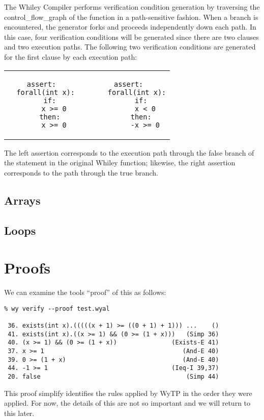 The Whiley Compiler performs verification condition generation by
traversing the \gls{control_flow_graph} of the function in a
path-sensitive fashion.  When a branch is encountered, the generator
forks and proceeds independently down each path.  In this case, four
verification conditions will be generated since there are two
 clauses and two execution paths.  The following
two verification conditions are generated for the first clause by each
execution path:

\begin{center}
\begin{tabular}{c c c}
\begin{minipage}[t]{0.45\textwidth}
\begin{lstlisting}[language=WyAL]
assert:
  forall(int x):
    if:
      x >= 0
    then:
      x >= 0
\end{lstlisting}
\end{minipage}&&
\begin{minipage}[t]{0.45\textwidth}
\begin{lstlisting}[language=WyAL]
  assert:
    forall(int x):
      if:
        x < 0
      then:
        -x >= 0
\end{lstlisting}
\end{minipage}\\
\end{tabular}
\end{center}
The left assertion corresponds to the execution path through the false
branch of the  statement in the original Whiley
function; likewise, the right assertion corresponds to the path
through the true branch.  

\subsection{Arrays}
\subsection{Loops}


\section{Proofs}

We can examine the tools ``proof'' of this as follows:
\begin{verbatim}
% wy verify --proof test.wyal

 36. exists(int x).(((((x + 1) >= ((0 + 1) + 1))) ...    () 
 41. exists(int x).((x >= 1) && (0 >= (1 + x)))   (Simp 36) 
 40. (x >= 1) && (0 >= (1 + x))               (Exists-E 41) 
 37. x >= 1                                      (And-E 40) 
 39. 0 >= (1 + x)                                (And-E 40) 
 44. -1 >= 1                                  (Ieq-I 39,37) 
 20. false                                        (Simp 44) 
\end{verbatim}
This proof simplify identifies the rules applied by WyTP in the order
they were applied.  For now, the details of this are not so important
and we will return to this later.
